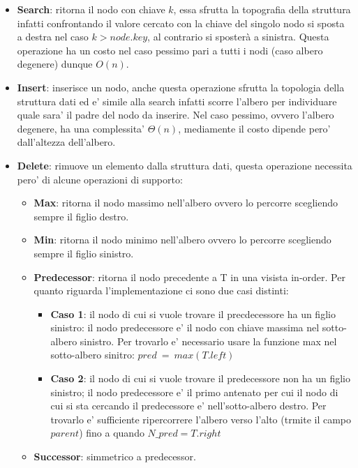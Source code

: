 \documentclass{article}
\begin{document}
\begin{itemize}
    \item \textbf{Search}: ritorna il nodo con chiave $k$, essa sfrutta la topografia della struttura infatti confrontando il valore cercato con la chiave del singolo nodo si sposta a destra nel caso $k>node.key$, al contrario si sposterà a sinistra. Questa operazione ha un costo nel caso pessimo pari a tutti i nodi (caso albero degenere) dunque $O(n)$.
    \item \textbf{Insert}: inserisce un nodo, anche questa operazione sfrutta la topologia della struttura dati ed e' simile alla search infatti scorre l'albero per individuare quale sara' il padre del nodo da inserire. 
                            Nel caso pessimo, ovvero l'albero degenere, ha una complessita' $\Theta(n)$, mediamente il costo dipende pero' dall'altezza dell'albero.
    \item \textbf{Delete}: rimuove un elemento dalla struttura dati, questa operazione necessita pero' di alcune operazioni di supporto: \begin{itemize}
        \item \textbf{Max}: ritorna il nodo massimo nell'albero ovvero lo percorre scegliendo sempre il figlio destro.
        \item \textbf{Min}: ritorna il nodo minimo nell'albero ovvero lo percorre scegliendo sempre il figlio sinistro.
        \item \textbf{Predecessor}: ritorna il nodo precedente a T in una visista in-order. Per quanto riguarda l'implementazione ci sono due casi distinti: 
        \begin{itemize}
            \item \textbf{Caso 1}: il nodo di cui si vuole trovare il precdecessore ha un figlio sinistro: il nodo predecessore e' il nodo con chiave massima nel sotto-albero sinistro.
                                   Per trovarlo e' necessario usare la funzione max nel sotto-albero sinitro: $pred\ =\ max(T.left)$ 
            \item \textbf{Caso 2}: il nodo di cui si vuole trovare il predecessore non ha un figlio sinistro; il nodo predecessore e' il primo antenato per cui il nodo di cui si sta cercando il predecessore e' nell'sotto-albero destro.
                                   Per trovarlo e' sufficiente ripercorrere l'albero verso l'alto (trmite il campo $parent$) fino a quando $N\_pred = T.right$
        \end{itemize}
        \item \textbf{Successor}: simmetrico a predecessor.

\end{itemize}
\end{itemize}
\end{document}
